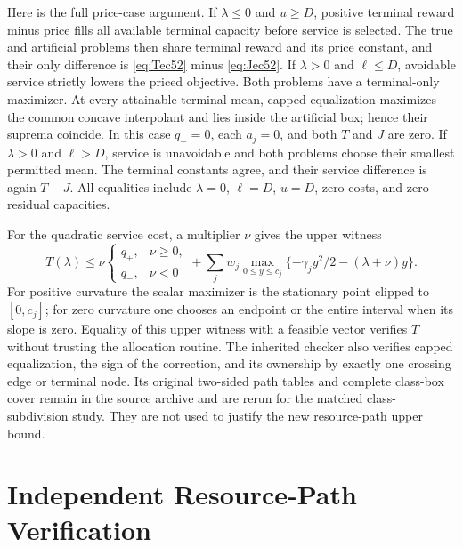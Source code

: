 Here is the full price-case argument. If $\lambda\leq0$ and $u\geq D$, positive terminal reward minus price fills all available terminal capacity before service is selected. The true and artificial problems then share terminal reward and its price constant, and their only difference is \eqref{eq:Tec52} minus \eqref{eq:Jec52}. If $\lambda>0$ and $\ell\leq D$, avoidable service strictly lowers the priced objective. Both problems have a terminal-only maximizer. At every attainable terminal mean, capped equalization maximizes the common concave interpolant and lies inside the artificial box; hence their suprema coincide. In this case $q_-=0$, each $a_j=0$, and both $T$ and $J$ are zero. If $\lambda>0$ and $\ell>D$, service is unavoidable and both problems choose their smallest permitted mean. The terminal constants agree, and their service difference is again $T-J$. All equalities include $\lambda=0$, $\ell=D$, $u=D$, zero costs, and zero residual capacities.

For the quadratic service cost, a multiplier $\nu$ gives the upper witness
\begin{equation}\label{eq:servicewitec52}
 T(\lambda)\leq
 \nu\begin{cases}q_+,&\nu\geq0,\\q_-,&\nu<0\end{cases}
 +\sum_jw_j\max_{0\leq y\leq c_j}\{-\gamma_jy^2/2-(\lambda+\nu)y\}.
\end{equation}
For positive curvature the scalar maximizer is the stationary point clipped to $[0,c_j]$; for zero curvature one chooses an endpoint or the entire interval when its slope is zero. Equality of this upper witness with a feasible vector verifies $T$ without trusting the allocation routine. The inherited checker also verifies capped equalization, the sign of the correction, and its ownership by exactly one crossing edge or terminal node. Its original two-sided path tables and complete class-box cover remain in the source archive and are rerun for the matched class-subdivision study. They are not used to justify the new resource-path upper bound.



\section{Independent Resource-Path Verification}\label{sec:checkec52}

